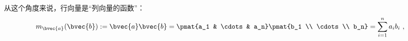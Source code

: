 
从这个角度来说，行向量是“列向量的函数”：
\begin{equation}
m_{\bvec{a}} (\bvec{b}) := \bvec{a} \bvec{b} = \pmat{a_1 & \cdots & a_n} \pmat{b_1 \\ \cdots \\ b_n} = \sum_{i = 1}^n a_i b_i~,
\end{equation}